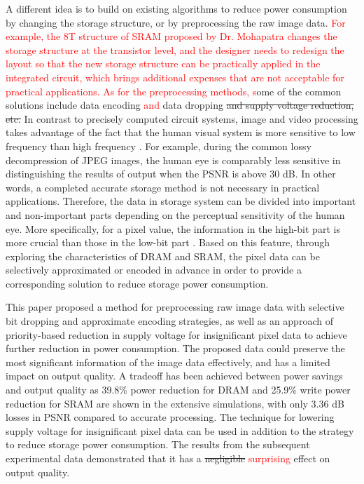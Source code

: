 \documentclass[lettersize,journal]{IEEEtran}
\begin{document}
A different idea is to build on existing algorithms to reduce power consumption by changing the storage structure, or by preprocessing the raw image data. \textcolor{red}{For example, the 8T structure of SRAM proposed by Dr. Mohapatra \cite{5686921} changes the storage structure at the transistor level, and the designer needs to redesign the layout so that the new storage structure can be practically applied in the integrated circuit, which brings additional expenses that are not acceptable for practical applications. As for the preprocessing methods, s}ome of the common solutions include data encoding \textcolor{red}{and} data dropping {\color{red}\sout{and supply voltage reduction, etc.}} In contrast to precisely computed circuit systems, image and video processing takes advantage of the fact that the human visual system is more sensitive to low frequency than high frequency \cite{wang2002video,7153874}. For example, during the common lossy decompression of JPEG images, the human eye is comparably less sensitive in distinguishing the results of output  when the PSNR is above 30 dB. In other words, a completed accurate storage method is not necessary in practical applications. Therefore, the data in storage system can be divided into important and non-important parts depending on the perceptual sensitivity of the human eye. More specifically, for a pixel value, the information in the high-bit part is more crucial than those in the low-bit part \cite{5523464}. Based on this feature, through exploring the characteristics of DRAM and SRAM, the pixel data can be selectively approximated or encoded in advance in order to provide a corresponding solution to reduce storage power consumption. 

This paper proposed a method for preprocessing raw image data with selective bit dropping and approximate encoding strategies, as well as an approach of priority-based reduction in supply voltage for insignificant pixel data to achieve further reduction in power consumption. The proposed data could preserve the most significant information of the image data effectively, and has a limited impact on output quality. A tradeoff has been achieved between power savings and output quality as 39.8\% power reduction for DRAM and 25.9\% write power reduction for SRAM are shown in the extensive simulations, with only 3.36 dB  losses in PSNR compared to accurate processing. The technique for lowering supply voltage for insignificant pixel data can be used in addition to the strategy to reduce storage power consumption. The results from the subsequent experimental data demonstrated that it has a {\color{red}\sout{negligible}} \textcolor{red}{surprising} effect on output quality.
\end{document}
